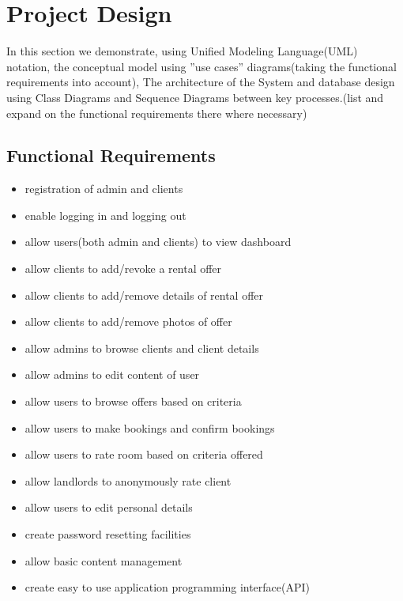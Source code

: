 \chapter{Project Design}

In this section we demonstrate, using Unified Modeling Language(UML) notation, the conceptual model using  ''use cases'' diagrams(taking the functional requirements into account), The architecture of the System and database design using Class Diagrams and  Sequence Diagrams between key processes.(list and expand on the functional requirements there where necessary)
\section{Functional Requirements}
\begin{itemize}
\item registration of admin and clients
\item enable logging in and logging out 
\item allow users(both admin and clients) to view dashboard
\item allow clients to add/revoke a rental offer
\item allow clients to add/remove details of rental offer
\item allow clients to add/remove photos of offer
\item allow admins to browse clients and client details
\item allow admins to edit content of user
\item allow users to browse offers based on criteria 
\item allow users to make bookings and confirm bookings
\item allow users to rate room based on criteria offered
\item allow landlords to anonymously rate client
\item allow users to edit personal details 
\item create password resetting facilities
\item allow basic content management
\item create easy to use application programming interface(API)
\end{itemize}
\clearpage
